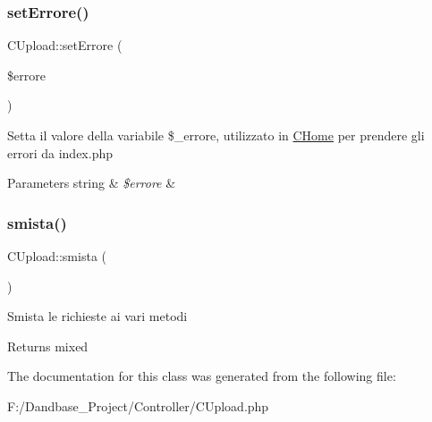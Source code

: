 \subsubsection{\texorpdfstring{set\+Errore()}{setErrore()}}
{\footnotesize\ttfamily C\+Upload\+::set\+Errore (\begin{DoxyParamCaption}\item[{}]{\$errore }\end{DoxyParamCaption})}

Setta il valore della variabile \$\+\_\+errore, utilizzato in \mbox{\hyperlink{class_c_home}{C\+Home}} per prendere gli errori da index.\+php


\begin{DoxyParams}[1]{Parameters}
string & {\em \$errore} & \\
\hline
\end{DoxyParams}
\mbox{\label{class_c_upload_a914c018af3f410672d19bb5433c28b97}} 
\subsubsection{\texorpdfstring{smista()}{smista()}}
{\footnotesize\ttfamily C\+Upload\+::smista (\begin{DoxyParamCaption}{ }\end{DoxyParamCaption})}

Smista le richieste ai vari metodi

\begin{DoxyReturn}{Returns}
mixed 
\end{DoxyReturn}


The documentation for this class was generated from the following file\+:\begin{DoxyCompactItemize}
\item 
F\+:/\+Dandbase\+\_\+\+Project/\+Controller/C\+Upload.\+php\end{DoxyCompactItemize}
